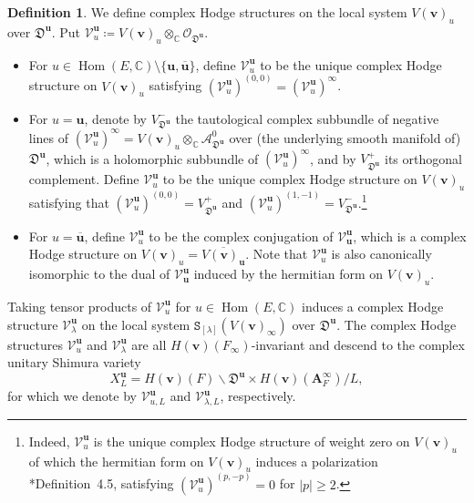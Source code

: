 \documentclass[12pt]{amsart}
\numberwithin{equation}{section}
\theoremstyle{plain}
\theoremstyle{definition}
\newtheorem{definition}[proposition]{Definition}
\theoremstyle{remark}
\renewcommand{\b}[1]{\mathbf{#1}}
\renewcommand{\c}[1]{\mathcal{#1}}
\renewcommand{\d}[1]{\mathbb{#1}}
\newcommand{\f}[1]{\mathfrak{#1}}
\newcommand{\s}[1]{\mathscr{#1}}
\renewcommand{\(}{\left(}
\renewcommand{\)}{\right)}
\newcommand{\ol}[1]{\overline{#1}{}}
\renewcommand{\geq}{\geqslant}
\newcommand{\bA}{\b A}
\newcommand{\cV}{\c V}
\newcommand{\dC}{\d C}
\newcommand{\fD}{\f D}
\newcommand{\sA}{\s A}
\newcommand{\sO}{\s O}
\newcommand{\sV}{\s V}
\newcommand{\tS}{\mathtt{S}}
\newcommand{\bbu}{\boldsymbol{u}}
\newcommand{\bbv}{\boldsymbol{v}}
\DeclareMathOperator{\Hom}{Hom}
\begin{document}
\begin{definition}\label{de:hodge_unitary}
We define complex Hodge structures on the local system $V(\bbv)_u$ over $\fD^{\bbu}$. Put $\sV^{\bbu}_u\coloneqq V(\bbv)_u\otimes_\dC\sO_{\fD^{\bbu}}$.
\begin{itemize}
  \item For $u\in\Hom(E,\dC)\setminus\{\bbu,\ol{\bbu}\}$, define $\cV^{\bbu}_u$ to be the unique complex Hodge structure on $V(\bbv)_u$ satisfying $(\cV^{\bbu}_u)^{(0,0)}=(\sV^{\bbu}_u)^\infty$.

  \item For $u=\bbu$, denote by $V_{\fD^{\bbu}}^-$ the tautological complex subbundle of negative lines of $(\sV^{\bbu}_u)^\infty=V(\bbv)_u\otimes_\dC\sA^0_{\fD^{\bbu}}$ over (the underlying smooth manifold of) $\fD^{\bbu}$, which is a holomorphic subbundle of $(\sV^{\bbu}_u)^\infty$, and by $V_{\fD^{\bbu}}^+$ its orthogonal complement. Define $\cV^{\bbu}_u$ to be the unique complex Hodge structure on $V(\bbv)_u$ satisfying that $(\cV^{\bbu}_u)^{(0,0)}=V_{\fD^{\bbu}}^+$ and $(\cV^{\bbu}_u)^{(1,-1)}=V_{\fD^{\bbu}}^-$.\footnote{Indeed, $\cV^{\bbu}_u$ is the unique complex Hodge structure of weight zero on $V(\bbv)_u$ of which the hermitian form on $V(\bbv)_u$ induces a polarization \cite{Liu26}*{Definition~4.5}, satisfying $(\cV^{\bbu}_u)^{(p,-p)}=0$ for $|p|\geq 2$.}

  \item For $u=\ol{\bbu}$, define $\cV^{\bbu}_u$ to be the complex conjugation of $\cV^{\bbu}_{\bbu}$, which is a complex Hodge structure on $V(\bbv)_u=\ol{V(\bbv)_{\bbu}}$. Note that $\cV^{\bbu}_u$ is also canonically isomorphic to the dual of $\cV^{\bbu}_{\bbu}$ induced by the hermitian form on $V(\bbv)_u$.
\end{itemize}

Taking tensor products of $\cV^{\bbu}_u$ for $u\in\Hom(E,\dC)$ induces a complex Hodge structure $\cV^{\bbu}_\lambda$ on the local system $\tS_{[\lambda]}(V(\bbv)_\infty)$ over $\fD^{\bbu}$. The complex Hodge structures $\cV^{\bbu}_u$ and $\cV^{\bbu}_\lambda$ are all $H(\bbv)(F_\infty)$-invariant and descend to the complex unitary Shimura variety
\[
X_L^{\bbu}=H(\bbv)(F)\backslash\fD^{\bbu}\times H(\bbv)(\bA_F^\infty)/L,
\]
for which we denote by $\cV^{\bbu}_{u,L}$ and $\cV^{\bbu}_{\lambda,L}$, respectively.
\end{definition}
\end{document}
